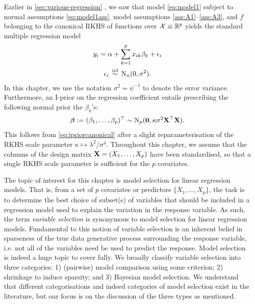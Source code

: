 \documentclass[showframe,11pt,twoside,openright]{report}
\begin{document}
\label{chapter6}
\thispagestyle{chaptersix}

Earlier in \cref{sec:various-regression} , we saw that model \cref{eq:model1} subject to normal assumptions \cref{eq:model1ass}, model assumptions \ref{ass:A1}--\ref{ass:A3}, and $f$ belonging to the canonical RKHS of functions over ${\mathcal X} \equiv \mathbb{R}^p$ yields the standard multiple regression model
\begin{align}\label{eq:linmod}
  \begin{gathered}
    y_i = \alpha + \sum_{k=1}^p x_{ik}\beta_k + \epsilon_i \\
    \epsilon_i \,\overset{\text{iid}}{\sim}\, \operatorname{N}_n(0, \sigma^2).
  \end{gathered}  
\end{align}
In this chapter, we use the notation $\sigma^2 = \psi^{-1}$ to denote the error variance.
Furthermore, an I-prior on the regression coefficient entails prescribing the following normal prior the $\beta_k$'s:
\[
  {\bm\beta} := (\beta_1,\dots,\beta_p)^\top \sim \operatorname{N}_p ({\mathbf 0},  \kappa \sigma^2 \mathbf X^\top \mathbf X).
\]
This follows from \cref{eq:ipriorcanonical} after a slight reparameterisation of the RKHS scale parameter $\kappa \mapsto \lambda^2/\sigma^4$. 
Throughout this chapter, we assume that the columns of the design matrix ${\mathbf X} = (X_1,\dots,X_p)$ have been standardised, so that a single RKHS scale parameter is sufficient for the $p$ covariates.

The topic of interest for this chapter is model selection for linear regression models.
That is, from a set of $p$ covariates or predictors $\{X_1,\dots,X_p\}$, the task is to determine the best choice of subset(s) of variables that should be included in a regression model used to explain the variation in the response variable.
As such, the term \emph{variable selection} is synonymous to model selection for linear regression models.
Fundamental to this notion of variable selection is an inherent belief in sparseness of the true data generative process surrounding the response variable, i.e. not all of the variables need be used to predict the response.
Model selection is indeed a huge topic to cover fully.
We broadly classify variable selection into three categories: 1) (pairwise) model comparison using some criterion; 2) shrinkage to induce sparsity; and 3) Bayesian model selection.
We understand that different categorisations and indeed categories of model selection exist in the literature, but our focus is on the discussion of the three types as mentioned.
\end{document}
